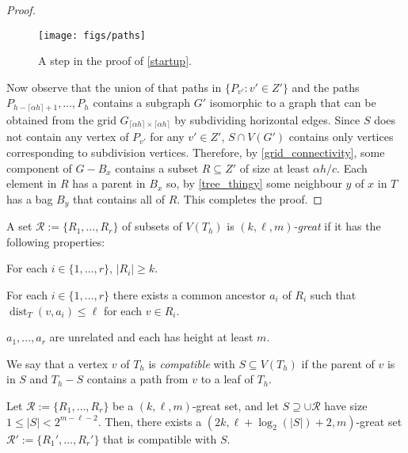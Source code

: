 \documentclass{patmorin}
\newcommand{\defin}[1]{\emph{\color{brightmaroon}#1}}
\DeclareMathOperator{\dist}{dist}
\renewcommand{\le}{\leqslant}
\renewcommand{\ge}{\geqslant}
\begin{document}
\begin{proof}
  \begin{figure}
    \begin{center}
      \texttt{[image: figs/paths]}
    \end{center}
    \caption{A step in the proof of \cref{startup}.}
    \label{paths}
  \end{figure}

  Now observe that the union of that paths in  $\{P_{v'}:v'\in Z'\}$ and the paths $P_{h-\lceil\alpha h\rceil+1},\ldots,P_{h}$ contains a subgraph $G'$ isomorphic to a graph that can be obtained from the grid $G_{\lceil \alpha h\rceil\times\lceil \alpha h\rceil}$ by subdividing horizontal edges.  Since $S$ does not contain any vertex of $P_{v'}$ for any $v'\in Z'$,  $S\cap V(G')$ contains only vertices corresponding to subdivision vertices.  Therefore, by \cref{grid_connectivity}, some component of $G-B_x$ contains a subset $R\subseteq Z'$ of size at least $\alpha h/c$.  Each element in $R$ has a parent in $B_x$ so, by \cref{tree_thingy} some neighbour $y$ of $x$ in $T$ has a bag $B_y$ that contains all of $R$.  This completes the proof.
\end{proof}


A set $\mathcal{R}:=\{R_1,\ldots,R_r\}$ of subsets of $V(T_h)$ is \defin{$(k,\ell,m)$-great} if it has the following properties:

\begin{compactenum}
  \item For each $i\in\{1,\ldots,r\}$, $|R_i|\ge k$.
  \item For each $i\in\{1,\ldots,r\}$ there exists a common ancestor $a_i$ of $R_i$ such that $\dist_T(v,a_i)\le\ell$ for each $v\in R_i$.
  \item $a_1,\ldots,a_r$ are unrelated and each has height at least $m$.
\end{compactenum}

We say that a vertex $v$ of $T_h$ is \defin{compatible} with $S\subseteq V(T_h)$ if the parent of $v$ is in $S$ and $T_h-S$ contains a path from $v$ to a leaf of $T_h$.


\begin{lem}\label{compatible_set}
  Let $\mathcal{R}:=\{R_1,\ldots,R_r\}$ be a $(k,\ell,m)$-great set,  and let $S\supseteq \cup\mathcal{R}$ have size $1\le |S|< 2^{m-\ell-2}$.  Then, there exists a $(2k,\ell + \log_2(|S|)+2,m)$-great set $\mathcal{R}':=\{R_1',\ldots,R_r'\}$ that is compatible with $S$.
\end{lem}
\end{document}
